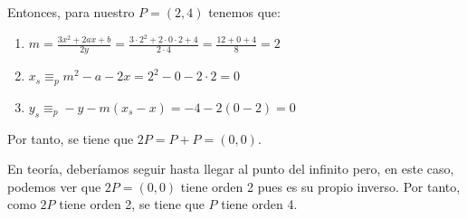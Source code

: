 \begin{enumerate}
		Entonces, para nuestro $P = (2, 4)$ tenemos que:
		\begin{enumerate}
			\item $\displaystyle m=\frac{3x^2 + 2ax + b}{2y} = \frac{3 \cdot 2^2 + 2 \cdot 0 \cdot 2 + 4}
			{2 \cdot 4} = \frac{12 + 0 + 4}{8} = 2$
			\item $x_s \equiv_p m^2 - a - 2x = 2^2 - 0 - 2 \cdot 2 = 0$
			\item $y_s \equiv_p -y - m(x_s - x) = -4 - 2(0 - 2) = 0$
		\end{enumerate}
		
		Por tanto, se tiene que $2P = P + P = (0, 0)$.
		
		En teoría, deberíamos seguir hasta llegar al punto del infinito pero, en este caso, podemos ver
		que $2P = (0, 0)$ tiene orden 2 pues es su propio inverso. Por tanto, como $2P$ tiene orden 2,
		se tiene que $P$ tiene orden 4.
	\end{enumerate}